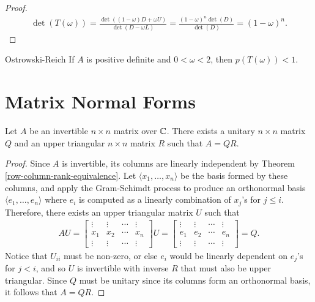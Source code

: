 \begin{proof}
    \begin{align*}
        \det\left(T(\omega)\right) = \frac{\det\left((1-\omega)D + \omega U\right)}{\det\left(D - \omega L\right)} = \frac{\left(1-\omega\right)^{n}\det\left(D\right)}{\det\left(D\right)} = \left(1 - \omega\right)^{n}.
    \end{align*}
\end{proof}

\begin{thm}{Ostrowski-Reich}\label{ostrowski-reich}\proofbreak
    If $A$ is positive definite and $0 < \omega < 2$, then $p(T(\omega)) < 1$.
\end{thm}

\section{Matrix Normal Forms}

\begin{thm}
    Let $A$ be an invertible $n \times n$ matrix over $\mathbb{C}$. There exists a unitary $n \times n$ matrix $Q$ and an upper triangular $n \times n$ matrix $R$ such that $A = QR$.
\end{thm}

\begin{proof}
    Since $A$ is invertible, its columns are linearly independent by Theorem \ref{row-column-rank-equivalence}. Let $\langle x_1, \ldots, x_n \rangle$ be the basis formed by these columns, and apply the Gram-Schimdt process to produce an orthonormal basis $\langle e_1, \ldots, e_n \rangle $ where $e_i$ is computed as a linearly combination of $x_j$'s for $j \leq i$. Therefore, there exists an upper triangular matrix $U$ such that
    \begin{align*}
        AU =
        \begin{bmatrix}
            \vdots & \vdots & \cdots & \vdots \\
            x_1 & x_2 & \cdots & x_n \\
            \vdots & \vdots & \cdots & \vdots
        \end{bmatrix}U = \begin{bmatrix}
            \vdots & \vdots & \cdots & \vdots \\
            e_1 & e_2 & \cdots & e_n \\
            \vdots & \vdots & \cdots & \vdots
        \end{bmatrix} = Q.
    \end{align*}
    Notice that $U_{ii}$ must be non-zero, or else $e_i$ would be linearly dependent on $e_j$'s for $j < i$, and so $U$ is invertible with inverse $R$ that must also be upper triangular. Since $Q$ must be unitary since its columns form an orthonormal basis, it follows that $A = QR$.
\end{proof}


